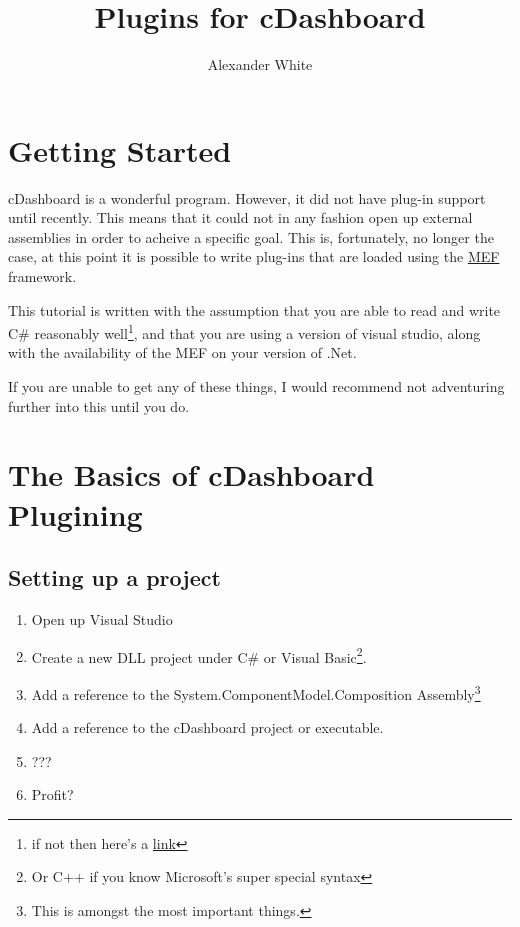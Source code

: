 \documentclass{article}
\begin{document}
\title{Plugins for cDashboard}
\author{Alexander White}
\maketitle
\tableofcontents

\section{Getting Started}

cDashboard is a wonderful program. However, it did not have plug-in support until recently. This means that it could not in any fashion open up external assemblies in order to acheive a specific goal. This is, fortunately, no longer the case, at this point it is possible to write plug-ins that are loaded using the \href{https://msdn.microsoft.com/en-us/library/dd460648\%28v=vs.110\%29.aspx}{MEF} framework. 

This tutorial is written with the assumption that you are able to read and write C\# reasonably well\footnote{if not then here's a \href{http://learnxinyminutes.com/docs/csharp/}{link}}, and that you are using a version of visual studio, along with the availability of the MEF on your version of .Net.

If you are unable to get any of these things, I would recommend not adventuring further into this until you do.

\section{The Basics of cDashboard Plugining}
\subsection{Setting up a project}
\begin{enumerate}
\item Open up Visual Studio
\item Create a new DLL project under C\# or Visual Basic\footnote{Or C++ if you know Microsoft's super special syntax}.
\item Add a reference to the System.ComponentModel.Composition Assembly\footnote{This is amongst the most important things.}
\item Add a reference to the cDashboard project or executable.
\item ???
\item Profit?
\end{enumerate}
\end{document}
